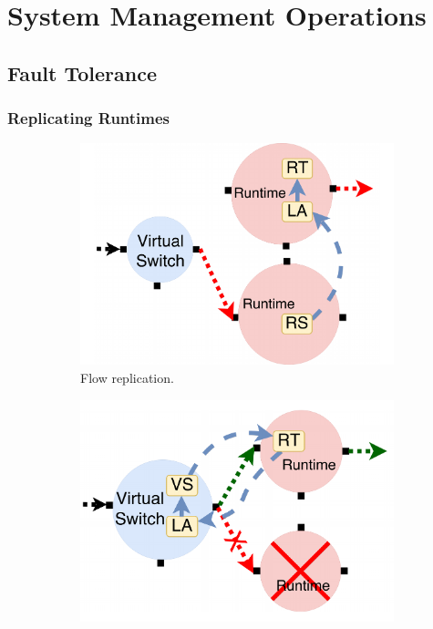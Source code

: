 \section{System Management Operations}
\label{sec:nfvactor-migration-replication}

\subsection{Fault Tolerance}
\label{sec:resilience}

\subsubsection{Replicating Runtimes}
\label{sec:replicating-runtime}
\begin{figure}[!h]
\begin{subfigure}[t]{0.49\linewidth}
   \centering
   \includegraphics[width=\columnwidth]{chap-nfvactor/figure/nfactor-replication.pdf}
   \caption{Flow replication.}\label{fig:rep}
  \end{subfigure}
  \begin{subfigure}[t]{0.49\linewidth}
     \centering
     \includegraphics[width=\columnwidth]{chap-nfvactor/figure/nfactor-recover.pdf}

\end{subfigure}
\end{figure}
